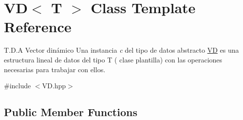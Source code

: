 \hypertarget{class_v_d}{}\section{VD$<$ T $>$ Class Template Reference}
\label{class_v_d}


T.\+D.\+A Vector dinámico Una instancia {\itshape c} del tipo de datos abstracto {\ttfamily \mbox{\hyperlink{class_v_d}{VD}}} es una estructura lineal de datos del tipo T ( clase plantilla) con las operaciones necesarias para trabajar con ellos.  




{\ttfamily \#include $<$V\+D.\+hpp$>$}

\subsection*{Public Member Functions}
